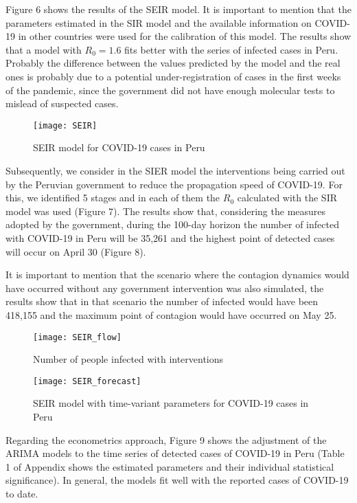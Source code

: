 \documentclass[12pt]{article}
\begin{document}
Figure 6 shows the results of the SEIR model. It is important to mention that the parameters estimated in the SIR model and the available information on COVID-19 in other countries were used for the calibration of this model. The results show that a model with $R_0 = 1.6$ fits better with the series of infected cases in Peru. Probably the difference between the values ​​predicted by the model and the real ones is probably due to a potential under-registration of cases in the first weeks of the pandemic, since the government did not have enough molecular tests to mislead of suspected cases.

\begin{figure}[h]
\centering
\texttt{[image: SEIR]}
\caption{SEIR model for COVID-19 cases in Peru}
\end{figure}

Subsequently, we consider in the SIER model the interventions being carried out by the Peruvian government to reduce the propagation speed of COVID-19. For this, we identified 5 stages and in each of them the $R_0$ calculated with the SIR model was used (Figure 7). The results show that, considering the measures adopted by the government, during the 100-day horizon the number of infected with COVID-19 in Peru will be 35,261 and the highest point of detected cases will occur on April 30 (Figure 8). 

It is important to mention that the scenario where the contagion dynamics would have occurred without any government intervention was also simulated, the results show that in that scenario the number of infected would have been 418,155 and the maximum point of contagion would have occurred on May 25.

\clearpage

\begin{figure}[h]
  \centering
\texttt{[image: SEIR\_flow]}
\caption{Number of people infected with interventions}

  \vspace{5mm}
  \vspace{5mm}
    \vspace{5mm}
    
\texttt{[image: SEIR\_forecast]}
\caption{SEIR model with time-variant parameters for COVID-19 cases in Peru}
\end{figure}

\clearpage

Regarding the econometrics approach, Figure 9 shows the adjustment of the ARIMA models to the time series of detected cases of COVID-19 in Peru (Table 1 of Appendix shows the estimated parameters and their individual statistical significance). In general, the models fit well with the reported cases of COVID-19 to date.
\end{document}
